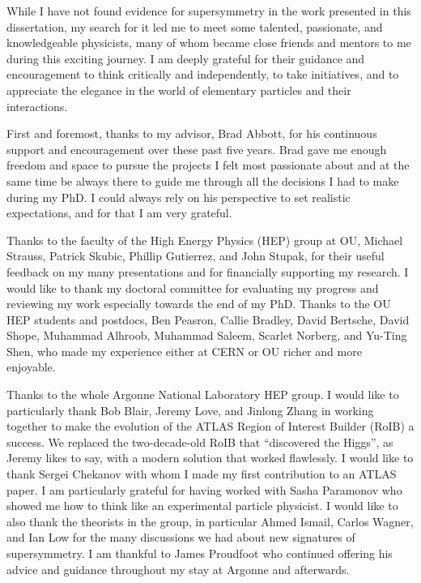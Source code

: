 While I have not found evidence for supersymmetry in the work presented in this dissertation, 
my search for it led me to meet some talented, passionate, and knowledgeable physicists, 
many of whom became close friends and mentors to me during this exciting journey. 
I am deeply grateful for their guidance and encouragement to think critically and independently,
to take initiatives, and to appreciate the elegance in the world of elementary particles 
and their interactions.

First and foremost, thanks to my advisor, Brad Abbott, for his continuous support and encouragement over these past five years. 
Brad gave me enough freedom and space to pursue the projects I felt most passionate about and at the same time be always
there to guide me through all the decisions I had to make during my PhD. I could always rely on his perspective to set realistic 
expectations, and for that I am very grateful.

Thanks to the faculty of the High Energy Physics (HEP) group at OU, Michael Strauss, Patrick Skubic, Phillip Gutierrez, 
and John Stupak,
for their useful feedback on my many presentations and for financially supporting my research.
I would like to thank my doctoral committee for evaluating my progress and reviewing my work especially towards the end 
of my PhD. 
Thanks to the OU HEP students and postdocs, Ben Peasron, Callie Bradley, David Bertsche, David Shope, Muhammad Alhroob, 
Muhammad Saleem, Scarlet Norberg, and Yu-Ting Shen, who made my experience 
either at CERN or OU richer and more enjoyable.

Thanks to the whole Argonne National Laboratory HEP group. 
I would like to particularly thank Bob Blair, Jeremy Love, and Jinlong Zhang in working together to make the evolution of the ATLAS 
Region of Interest Builder (RoIB) a success. 
We replaced the two-decade-old RoIB that ``discovered the Higgs'', as Jeremy likes to say, with a modern solution 
that worked flawlessly.
I would like to thank Sergei Chekanov with whom I made my first contribution to an ATLAS paper.
I am particularly grateful for having worked with Sasha Paramonov who showed me how to think like an experimental particle physicist.
I would like to also thank the theorists in the group, in particular Ahmed Ismail, Carlos Wagner, and Ian Low for the many 
discussions we had about new signatures of supersymmetry.
I am thankful to James Proudfoot who continued offering his advice and guidance throughout my stay at Argonne and afterwards.

